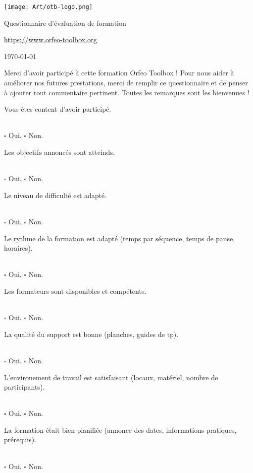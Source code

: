 \documentclass[10pt,a4paper]{article}
\begin{document}
\begin{center}
\texttt{[image: Art/otb-logo.png]}

Questionnaire d'évaluation de formation

{\small\url{https://www.orfeo-toolbox.org}}

\today
\end{center}

\begin{center}
\begin{minipage}{.8\textwidth}
Merci d'avoir participé à cette formation Orfeo Toolbox ! Pour nous aider à
améliorer nos futures prestations, merci de remplir ce questionnaire et de
penser à ajouter tout commentaire pertinent. Toutes les remarques sont les
bienvenues !
\end{minipage}
\end{center}

\newcommand{\answer}{
\\ \quad $\square$ Oui. \quad $\square$ Non.\\
\vspace{4em}
}

Vous êtes content d'avoir participé.
\answer

Les objectifs annoncés sont atteinds.
\answer

Le niveau de difficulté est adapté.
\answer

Le rythme de la formation est adapté (temps par séquence, temps de pause,
horaires).
\answer

Les formateurs sont disponibles et compétents.
\answer

La qualité du support est bonne (planches, guides de tp).
\answer

L'environement de travail est satisfaisant (locaux, matériel, nombre de
participants).
\answer

La formation était bien planifiée (annonce des dates, informations pratiques,
prérequis).
\answer

\newcommand{\moduleanswer}{
\\
\begin{tabular}{rlll}  
  Difficultée:         & $\square$ Adaptée & $\square$ Difficile & $\square$
  Facile\\
  Temps alloué:       & $\square$ Adapté  & $\square$ Manque de temps pour tout
  faire & $\square$ Manque de choses à faire\\
  Qualité du support: & $\square$ Bonne & $\square$ À améliorer: & \\
  Commentaire: &&&\\
\end{tabular}
\vspace{4em}
}
\end{document}
